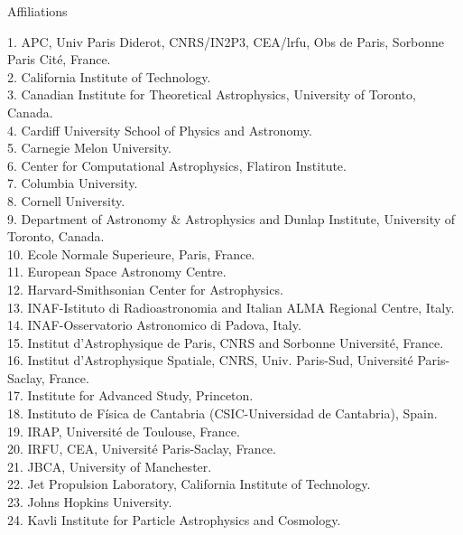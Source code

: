 \documentclass[PICOReport.tex]{subfiles}
\begin{document}
\Large  {\centerline {Affiliations}}

\begin{multicols}{2}
\raggedright
\scriptsize {
1. APC, Univ Paris Diderot, CNRS/IN2P3, CEA/lrfu, Obs de Paris, Sorbonne Paris Cit\'e, France.  \\
2. California Institute of Technology.  \\
3. Canadian Institute for Theoretical Astrophysics, University of Toronto, Canada.  \\
4. Cardiff University School of Physics and Astronomy.  \\
5. Carnegie Melon University.  \\
6. Center for Computational Astrophysics, Flatiron Institute.  \\
7. Columbia University.  \\
8. Cornell University.  \\
9. Department of Astronomy \& Astrophysics and Dunlap Institute, University of Toronto, Canada.  \\
10. Ecole Normale Superieure, Paris, France.  \\
11. European Space Astronomy Centre.  \\
12. Harvard-Smithsonian Center for Astrophysics.  \\
13. INAF-Istituto di Radioastronomia and Italian ALMA Regional Centre, Italy.  \\
14. INAF-Osservatorio Astronomico di Padova, Italy.  \\
15. Institut d'Astrophysique de Paris, CNRS and Sorbonne Universit\'e, France.  \\
16. Institut d'Astrophysique Spatiale, CNRS, Univ. Paris-Sud, Universit\'e Paris-Saclay, France.  \\
17. Institute for Advanced Study, Princeton.  \\
18. Instituto de F\'isica de Cantabria (CSIC-Universidad de Cantabria), Spain.  \\
19. IRAP, Universit\'e de Toulouse, France.  \\
20. IRFU, CEA, Universit\'e Paris-Saclay, France.  \\
21. JBCA, University of Manchester.  \\
22. Jet Propulsion Laboratory, California Institute of Technology.  \\
23. Johns Hopkins University.  \\
24. Kavli Institute for Particle Astrophysics and Cosmology.  \\
}
\end{multicols}
\end{document}
